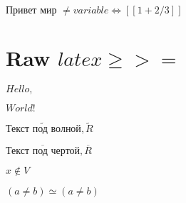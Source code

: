 
\(\text{Привет }\allowbreak\text{мир }\allowbreak\neq variable \Leftrightarrow [[1 + 2 / 3]]\)

\section{Raw $latex \ge >=$}


\(Hello, \)\( World!\)

\(\widetilde {\text{Текст }\allowbreak\text{под }\allowbreak\text{волной}\allowbreak}, \widetilde R\)

\(\overline {\text{Текст }\allowbreak\text{под }\allowbreak\text{чертой}\allowbreak}, \overline R\)

\(x \not\in V\)

\((a \neq b) \simeq (a \neq b)\)
